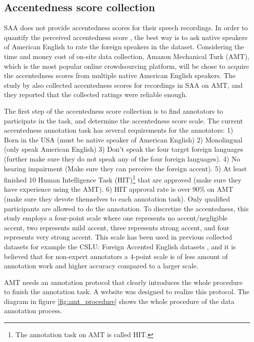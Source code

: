 \subsection{Accentedness score collection}

SAA does not provide accentedness scores for their speech recordings. In order to quantify the perceived accentedness score , the best way is to ask native speakers of American English to rate the foreign speakers in the dataset. Considering the time and money cost of on-site data collection, Amazon Mechanical Turk (AMT), which is the most popular online crowdsourcing platform, will be chose to acquire the accentedness scores from multiple native American English speakers. The study by \cite{kunath2010wisdom} also collected accentedness scores for recordings in SAA on AMT, and they reported that the collected ratings were reliable enough.

The first step of the accentedness score collection is to find annotators to participate in the task, and determine the accentedness score scale. The current accentedness annotation task has several requirements for the annotators: 1) Born in the USA (must be native speaker of American English) 2) Monolingual (only speak American English) 3) Don't speak the four target foreign languages (further make sure they do not speak any of the four foreign languages). 4) No hearing impairment (Make sure they can perceive the foreign accent). 5) At least finished 10 Human Intelligence Task (HIT)\footnote{The annotation task on AMT is called HIT.} that are approved (make sure they have experience using the AMT). 6) HIT approval rate is over 90\% on AMT (make sure they devote themselves to each annotation task). Only qualified participants are allowed to do the annotation. To discretize the accentedness, this study employs a four-point scale where one represents no accent/negligible accent, two represents mild accent, three represents strong accent, and four represents very strong accent. This scale has been used in previous collected datasets for example the CSLU: Foreign Accented English datasets \citep{choueiter2008empirical}, and it is believed that for non-expert annotators a 4-point scale is of less amount of annotation work and higher accuracy compared to a larger scale.

AMT needs an annotation protocol that clearly introduces the whole procedure to finish the annotation task. A website was designed to realize this protocol. The diagram in figure \ref{fig:amt_procedure} shows the whole procedure of the data annotation process.


